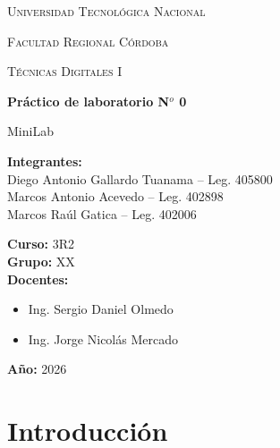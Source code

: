 \documentclass[12pt,a4paper]{article}
\begin{document}
\begin{titlepage}
    \centering

    {\scshape\LARGE Universidad Tecnológica Nacional \par}
    \vspace{0.3cm}
    {\scshape\Large Facultad Regional Córdoba \par}
    \vspace{1.5cm}

    {\scshape\Large Técnicas Digitales I \par}
    \vspace{2cm}

    {\Huge\bfseries Práctico de laboratorio N$^o$ 0 \par}
    \vspace{0.5cm}
    {\LARGE MiniLab \par}

    \vspace{2cm}

    \begin{flushleft}
    \textbf{Integrantes:} \\
    Diego Antonio Gallardo Tuanama -- Leg. 405800 \\
    Marcos Antonio Acevedo -- Leg. 402898 \\
    Marcos Raúl Gatica -- Leg. 402006 \\

    \vspace{0.5cm}

    \textbf{Curso:} 3R2 \\
    \textbf{Grupo:} XX \\
    \textbf{Docentes:} 
    \begin{itemize}
        \item Ing. Sergio Daniel Olmedo
        \item Ing. Jorge Nicolás Mercado
    \end{itemize}
    \textbf{Año:} 2026 \\
    \end{flushleft}

    \vfill

\end{titlepage}
\thispagestyle{empty}
\text{}
\newpage
\tableofcontents\thispagestyle{empty}\setcounter{page}{0}
\newpage\text{}\thispagestyle{empty}\setcounter{page}{0}\newpage

\section{Introducción}
\end{document}
